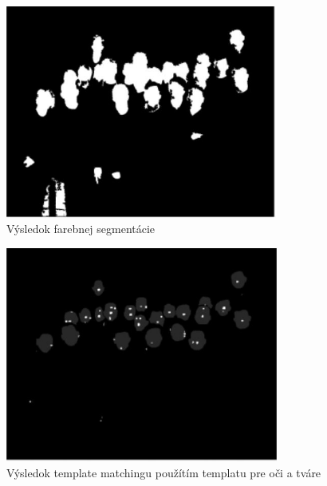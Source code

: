 \begin{figure}[H]
\centerline{\includegraphics[width=0.8\textwidth]{images/skin}}
\caption[Detekcia tvára]{Výsledok farebnej segmentácie}
\label{obr:skin}
\end{figure}

\begin{figure}[H]
\centerline{\includegraphics[width=0.8\textwidth]{images/template}}
\caption[Detekcia tvára]{Výsledok template matchingu použítím templatu pre oči a tváre}
\label{obr:template}
\end{figure}

